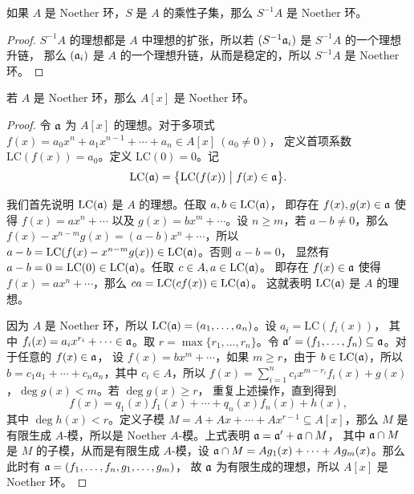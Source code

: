 \begin{proposition}
  如果 $A$ 是 Noether 环，$S$ 是 $A$ 的乘性子集，那么 $S^{-1}A$ 是 Noether 环。
\end{proposition}
\begin{proof}
  $S^{-1}A$ 的理想都是 $A$ 中理想的扩张，所以若 $(S^{-1}\mathfrak{a}_i)$ 是 $S^{-1}A$ 的一个理想升链，
  那么 $(\mathfrak{a}_i)$ 是 $A$ 的一个理想升链，从而是稳定的，所以 $S^{-1}A$ 是 Noether 环。
\end{proof}

\begin{theorem}
  若 $A$ 是 Noether 环，那么 $A[x]$ 是 Noether 环。
\end{theorem}
\begin{proof}
  令 $\mathfrak{a} $ 为 $A[x]$ 的理想。对于多项式 $f(x)=a_0x^n+a_1x^{n-1}+\cdots+a_n\in A[x]\ (a_0\neq 0)$，
  定义首项系数 $\mathrm{LC}(f(x))=a_0$。定义 $\mathrm{LC}(0)=0$。记
  \[
    \mathrm{LC}(\mathfrak{a})=\bigl\{\mathrm{LC}(f(x)) \bigm| f(x)\in\mathfrak{a}\bigr\}.
  \]
  
  我们首先说明 $\mathrm{LC}(\mathfrak{a})$ 是 $A$ 的理想。任取 $a,b\in\mathrm{LC}(\mathfrak{a})$，
  即存在 $f(x),g(x)\in\mathfrak{a}$ 使得 $f(x)=ax^n+\cdots$ 以及 $g(x)=bx^m+\cdots$。设
  $n\geq m$，若 $a-b\neq 0$，那么 $f(x)-x^{n-m}g(x)=(a-b)x^n+\cdots$，所以
  $a-b=\mathrm{LC}(f(x)-x^{n-m}g(x))\in\mathrm{LC}(\mathfrak{a})$。否则 $a-b=0$，
  显然有 $a-b=0=\mathrm{LC}(0)\in\mathrm{LC}(\mathfrak{a})$。任取 $c\in A,a\in\mathrm{LC}(\mathfrak{a})$。
  即存在 $f(x)\in\mathfrak{a}$ 使得 $f(x)=ax^n+\cdots$，那么 $ca=\mathrm{LC}(cf(x))\in\mathrm{LC}(\mathfrak{a})$。
  这就表明 $\mathrm{LC}(\mathfrak{a})$ 是 $A$ 的理想。

  因为 $A$ 是 Noether 环，所以 $\mathrm{LC}(\mathfrak{a})=(a_1,\dots,a_n)$。设 $a_i=\mathrm{LC}(f_i(x))$，
  其中 $f_i(x)=a_ix^{r_i}+\cdots\in\mathfrak{a}$。取 $r=\max\{r_1,\dots,r_n\}$。令 
  $\mathfrak{a}'=(f_1,\dots,f_n)\subseteq\mathfrak{a}$。对于任意的 $f(x)\in\mathfrak{a}$，
  设 $f(x)=bx^m+\cdots$，如果 $m\geq r$，由于 $b\in\mathrm{LC}(\mathfrak{a})$，所以
  $b=c_1a_1+\cdots+c_na_n$，其中 $c_i\in A$，所以
  $f(x)=\sum_{i=1}^n c_ix^{m-r_i}f_i(x)+g(x)$，$\deg g(x)<m$。若 $\deg g(x)\geq r$，
  重复上述操作，直到得到
  \[
    f(x)=q_1(x)f_1(x)+\cdots+q_n(x)f_n(x)+h(x),
  \]
  其中 $\deg h(x)<r$。定义子模 $M=A+Ax+\cdots+Ax^{r-1}\subseteq A[x]$，那么 $M$ 是有限生成
  $A$-模，所以是 Noether $A$-模。上式表明 $\mathfrak{a}=\mathfrak{a}'+\mathfrak{a}\cap M$，
  其中 $\mathfrak{a}\cap M$ 是 $M$ 的子模，从而是有限生成 $A$-模，设 
  $\mathfrak{a}\cap M=Ag_1(x)+\cdots+Ag_m(x)$。那么此时有
  $\mathfrak{a}=(f_1,\dots,f_n,g_1,\dots,g_m)$，
  故 $\mathfrak{a}$ 为有限生成的理想，所以 $A[x]$ 是 Noether 环。
\end{proof}

